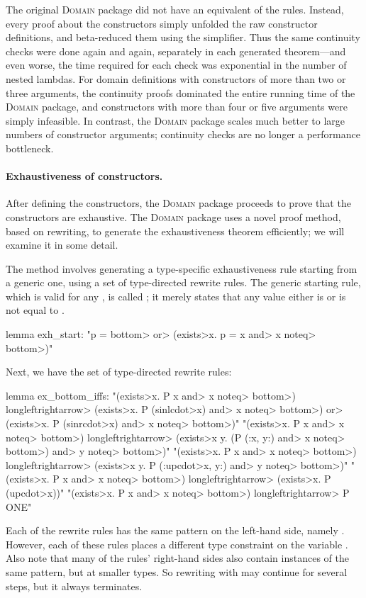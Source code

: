 The original  \textsc{Domain} package did not have an equivalent of the  rules. Instead, every proof about the constructors simply unfolded the raw constructor definitions, and beta-reduced them using the simplifier. Thus the same continuity checks were done again and again, separately in each generated theorem---and even worse, the time required for each check was exponential in the number of nested lambdas. For domain definitions with constructors of more than two or three arguments, the continuity proofs dominated the entire running time of the \textsc{Domain} package, and constructors with more than four or five arguments were simply infeasible. In contrast, the  \textsc{Domain} package scales much better to large numbers of constructor arguments; continuity checks are no longer a performance bottleneck.

\paragraph{Exhaustiveness of constructors.}

After defining the constructors, the \textsc{Domain} package proceeds to prove that the constructors are exhaustive. The  \textsc{Domain} package uses a novel proof method, based on rewriting, to generate the exhaustiveness theorem efficiently; we will examine it in some detail.

The method involves generating a type-specific exhaustiveness rule starting from a generic one, using a set of type-directed rewrite rules. The generic starting rule, which is valid for any , is called ; it merely states that any value  either is or is not equal to .
%
\begin{isacode}
lemma exh_start: "p = \<bottom> \<or> (\<exists>x. p = x \<and> x \<noteq> \<bottom>)"
\end{isacode}
%
Next, we have the set of type-directed rewrite rules:
%
\begin{isacode}
lemma ex_bottom_iffs:
  "(\<exists>x. P x \<and> x \<noteq> \<bottom>) \<longleftrightarrow> (\<exists>x. P (sinl\<cdot>x) \<and> x \<noteq> \<bottom>) \<or> (\<exists>x. P (sinr\<cdot>x) \<and> x \<noteq> \<bottom>)"
  "(\<exists>x. P x \<and> x \<noteq> \<bottom>) \<longleftrightarrow> (\<exists>x y. (P (:x, y:) \<and> x \<noteq> \<bottom>) \<and> y \<noteq> \<bottom>)"
  "(\<exists>x. P x \<and> x \<noteq> \<bottom>) \<longleftrightarrow> (\<exists>x y. P (:up\<cdot>x, y:) \<and> y \<noteq> \<bottom>)"
  "(\<exists>x. P x \<and> x \<noteq> \<bottom>) \<longleftrightarrow> (\<exists>x. P (up\<cdot>x))"
  "(\<exists>x. P x \<and> x \<noteq> \<bottom>) \<longleftrightarrow> P ONE"
\end{isacode}
%
Each of the rewrite rules has the same pattern on the left-hand side, namely . However, each of these rules places a different type constraint on the variable . Also note that many of the rules' right-hand sides also contain instances of the same pattern, but at smaller types. So rewriting with  may continue for several steps, but it always terminates.

